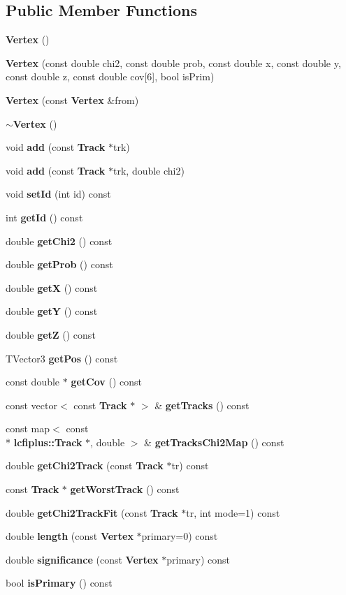 \subsection*{Public Member Functions}
\begin{DoxyCompactItemize}
\item 
{\bf Vertex} ()
\item 
{\bf Vertex} (const double chi2, const double prob, const double x, const double y, const double z, const double cov[6], bool is\-Prim)
\item 
{\bf Vertex} (const {\bf Vertex} \&from)
\item 
{\bf $\sim$\-Vertex} ()
\item 
void {\bf add} (const {\bf Track} $\ast$trk)
\item 
void {\bf add} (const {\bf Track} $\ast$trk, double chi2)
\item 
void {\bf set\-Id} (int id) const 
\item 
int {\bf get\-Id} () const 
\item 
double {\bf get\-Chi2} () const 
\item 
double {\bf get\-Prob} () const 
\item 
double {\bf get\-X} () const 
\item 
double {\bf get\-Y} () const 
\item 
double {\bf get\-Z} () const 
\item 
T\-Vector3 {\bf get\-Pos} () const 
\item 
const double $\ast$ {\bf get\-Cov} () const 
\item 
const vector$<$ const {\bf Track} $\ast$ $>$ \& {\bf get\-Tracks} () const 
\item 
const map$<$ const \\*
{\bf lcfiplus\-::\-Track} $\ast$, double $>$ \& {\bf get\-Tracks\-Chi2\-Map} () const 
\item 
double {\bf get\-Chi2\-Track} (const {\bf Track} $\ast$tr) const 
\item 
const {\bf Track} $\ast$ {\bf get\-Worst\-Track} () const 
\item 
double {\bf get\-Chi2\-Track\-Fit} (const {\bf Track} $\ast$tr, int mode=1) const 
\item 
double {\bf length} (const {\bf Vertex} $\ast$primary=0) const 
\item 
double {\bf significance} (const {\bf Vertex} $\ast$primary) const 
\item 
bool {\bf is\-Primary} () const 
\item 

\end{DoxyCompactItemize}

